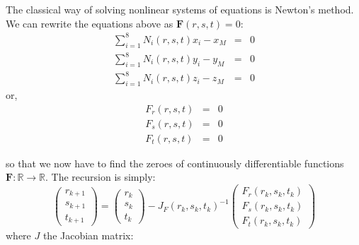 The classical way of solving nonlinear systems of equations is Newton's method. 
We can rewrite the equations above as ${\bm F}(r,s,t)=0$:
\begin{eqnarray}
\sum_{i=1}^8 N_i(r,s,t) x_i - x_M&=&0 \nonumber\\
\sum_{i=1}^8 N_i(r,s,t) y_i - y_M&=&0 \nonumber\\
\sum_{i=1}^8 N_i(r,s,t) z_i - z_M&=&0
\end{eqnarray}
or,
\begin{eqnarray}
F_r(r,s,t)&=&0 \nonumber\\
F_s(r,s,t)&=&0 \nonumber\\
F_t(r,s,t)&=&0 \nonumber
\end{eqnarray}

so that we now have to find the zeroes of continuously differentiable functions ${\bm F}:\mathbb{R} \rightarrow \mathbb{R}$.
The recursion is simply:
\[
\left(
\begin{array}{c}
r_{k+1} \\s_{k+1} \\ t_{k+1}
\end{array}
\right)
=
\left(
\begin{array}{c}
r_{k} \\s_{k} \\ t_{k}
\end{array}
\right)
- J_F(r_k,s_k,t_k) ^{-1} 
\left(
\begin{array}{c}
F_r(r_k,s_k,t_k) \\
F_s(r_k,s_k,t_k)\\
F_t(r_k,s_k,t_k)
\end{array}
\right)
\]
where $J$ the Jacobian matrix:
